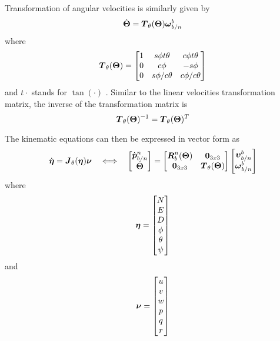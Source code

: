 Transformation of angular velocities is similarly given by 
\begin{equation}\label{eq:eulerAnglesdot}
\dot{\boldsymbol{\Theta}} = \boldsymbol{T}_{\theta}(\boldsymbol{\Theta})\boldsymbol{\omega}^b_{b/n}
\end{equation}
where
\begin{equation}
\boldsymbol{T}_{\theta}(\boldsymbol{\Theta}) = \begin{bmatrix}
1 & s\phi t\theta & c\phi t\theta \\
0 & c\phi & -s\phi \\
0 & s\phi/c\theta & c\phi/c\theta
\end{bmatrix}
\end{equation}
and $t\cdot$ stands for $\tan(\cdot)$ \citep[p. 24]{fossen2011}. Similar to the linear velocities transformation matrix, the inverse of the transformation matrix is
\begin{equation}
\boldsymbol{T}_{\theta}(\boldsymbol{\Theta})^{-1} = \boldsymbol{T}_{\theta}(\boldsymbol{\Theta})^T
\end{equation}

The kinematic equations can then be expressed in vector form as 
\begin{equation} \label{eq:kinematicsticsEuler}
\dot{\boldsymbol{\eta}} = \boldsymbol{J}_\theta(\boldsymbol{\eta})\boldsymbol{\nu}
\quad\Longleftrightarrow\quad
\begin{bmatrix}
\dot{\boldsymbol{p}}^n_{b/n} \\
\dot{\boldsymbol{\Theta}}
\end{bmatrix}
=
\begin{bmatrix}
\boldsymbol{R}^n_b(\boldsymbol{\Theta}) & \boldsymbol{0}_{3x3} \\
\boldsymbol{0}_{3x3} & \boldsymbol{T}_\theta(\boldsymbol{\Theta})
\end{bmatrix}
\begin{bmatrix}
\boldsymbol{\upsilon}^b_{b/n} \\
\boldsymbol{\omega}^b_{b/n}
\end{bmatrix}
\end{equation}
where 
\begin{equation}
\boldsymbol{\eta} = \begin{bmatrix}
N\\
E\\
D\\
\phi\\
\theta\\
\psi
\end{bmatrix}
\end{equation}
and
\begin{equation}
\boldsymbol{\nu} = \begin{bmatrix}
    u\\ v\\ w \\ p \\ q \\ r 
    \end{bmatrix}
\end{equation}


